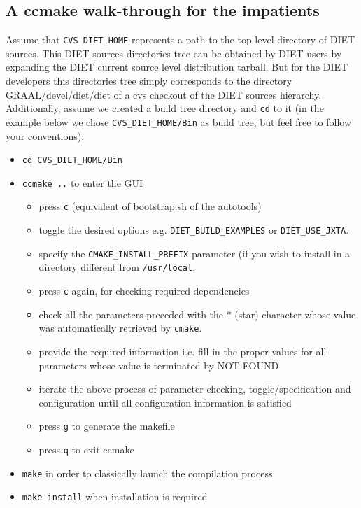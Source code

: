 \subsection{A ccmake walk-through for the impatients}

Assume that \verb+CVS_DIET_HOME+ represents a path to the top level
directory of DIET sources.
This DIET sources directories tree can be obtained by DIET users by
expanding the DIET current source level distribution tarball.
But for the DIET developers this directories tree simply corresponds to
the directory GRAAL/devel/diet/diet of a cvs checkout of the DIET sources
hierarchy.
Additionally, assume we created a build tree directory and \verb+cd+
to it (in the example below we chose \verb+CVS_DIET_HOME/Bin+ as
build tree, but feel free to follow your conventions):
\begin{itemize}
\item
  \verb+cd CVS_DIET_HOME/Bin+
\item
  \verb+ccmake ..+ to enter the GUI
  \begin{itemize}
  \item press \verb+c+ (equivalent of bootstrap.sh of the autotools)
  \item toggle the desired options e.g. \verb+DIET_BUILD_EXAMPLES+ or
     \verb+DIET_USE_JXTA+. 
  \item specify the \verb+CMAKE_INSTALL_PREFIX+ parameter (if you wish
     to install in a directory different from \verb+/usr/local+,
  \item press \verb+c+ again, for checking required dependencies
  \item check all the parameters preceded with the * (star) character
     whose value was automatically retrieved by \verb+cmake+.
  \item provide the required information i.e. fill in the proper values
     for all parameters whose value is terminated by NOT-FOUND
  \item iterate the above process of parameter checking, toggle/specification
     and configuration until all configuration information is satisfied
  \item press \verb+g+ to generate the makefile
  \item press \verb+q+ to exit ccmake
  \end{itemize}
\item
  \verb+make+ in order to classically launch the compilation process
\item
  \verb+make install+ when installation is required
\end{itemize}

